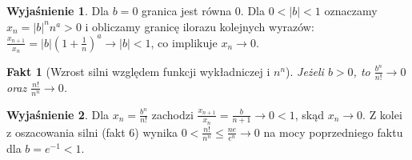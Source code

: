 \documentclass[11pt, a4paper]{article}
\theoremstyle{plain}
\newtheorem{fakt}{Fakt}
\theoremstyle{definition}
\newtheorem*{wyjasnienie}{Wyjaśnienie}
\begin{document}
\begin{wyjasnienie}
Dla $b = 0$ granica jest równa $0$. Dla $0 < \lvert b \rvert < 1$ oznaczamy $x_n = \lvert b \rvert^n n^a > 0$ i obliczamy granicę ilorazu kolejnych wyrazów: $\frac{x_{n+1}}{x_n} = \lvert b \rvert \left(1 + \frac{1}{n}\right)^a \to \lvert b \rvert < 1$, co implikuje $x_n \to 0$.
\end{wyjasnienie}

\begin{fakt}[Wzrost silni względem funkcji wykładniczej i $n^n$]
Jeżeli $b > 0$, to $\frac{b^n}{n!} \to 0$ oraz $\frac{n!}{n^n} \to 0$.
\end{fakt}

\begin{wyjasnienie}
Dla $x_n = \frac{b^n}{n!}$ zachodzi $\frac{x_{n+1}}{x_n} = \frac{b}{n + 1} \to 0 < 1$, skąd $x_n \to 0$. Z kolei z oszacowania silni (fakt 6) wynika $0 < \frac{n!}{n^n} \leqslant \frac{n e}{e^n} \to 0$ na mocy poprzedniego faktu dla $b = e^{-1} < 1$.
\end{wyjasnienie}
\end{document}
